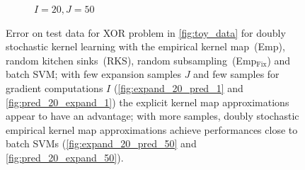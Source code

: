 \documentclass{article} %
\begin{document}
\begin{figure}[!ht]
\begin{subfigure}[b]{0.235\textwidth}
        \caption{$I=20, J=50$}
        \label{fig:pred_20_expand_50}
    \end{subfigure}
    \caption{Error on test data for XOR problem in \autoref{fig:toy_data} for doubly stochastic kernel learning with the empirical kernel map~(Emp), random kitchen sinks~(RKS), random subsampling~(Emp$_{\text{Fix}}$) and batch SVM; with few expansion samples $J$ and few samples for gradient computations $I$ (\autoref{fig:expand_20_pred_1} and \autoref{fig:pred_20_expand_1}) the explicit kernel map approximations appear to have an advantage; with more samples, doubly stochastic empirical kernel map approximations achieve performances close to batch SVMs (\autoref{fig:expand_20_pred_50} and \autoref{fig:pred_20_expand_50}).}
    \label{fig:toydata_comparisons}
\end{figure}
%
\end{document}

